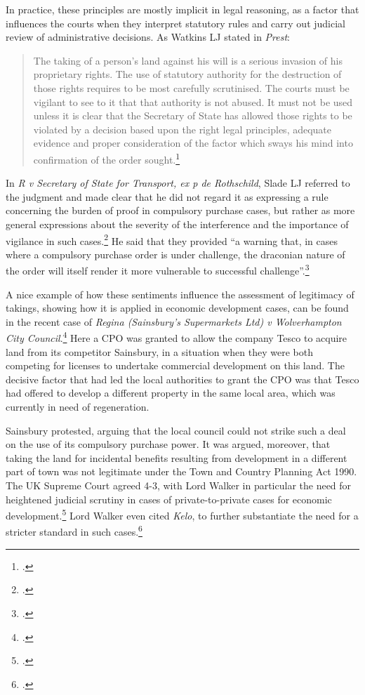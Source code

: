 In practice, these principles are mostly implicit in legal reasoning, as a factor that influences the courts when they interpret statutory rules and carry out judicial review of administrative decisions. As Watkins LJ stated in {\it Prest}:

\begin{quote}
The taking of a person's land against his will is a serious invasion of his proprietary rights. The use of statutory authority for the destruction of those rights requires to be most carefully scrutinised. The courts must be vigilant to see to it that that authority is not abused. It must not be used unless it is clear that the Secretary of State has allowed those rights to be violated by a decision based upon the right legal principles, adequate evidence and proper consideration of the factor which sways his mind into confirmation of the order sought.\footcite[211-212]{prest82}
\end{quote}

In {\it R v Secretary of State for Transport, ex p de Rothschild}, Slade LJ referred to the judgment and made clear that he did not regard it as expressing a rule concerning the burden of proof in compulsory purchase cases, but rather as more general expressions about the severity of the interference and the importance of vigilance in such cases.\footcite{rothschild89} He said that they provided ``a warning that, in cases where a compulsory purchase order is under challenge, the draconian nature of the order will itself render it more vulnerable to successful challenge''.\footcite[938]{rothschild89}

A nice example of how these sentiments influence the assessment of legitimacy of takings, showing how it is applied in economic development cases, can be found in the recent case of {\it Regina (Sainsbury’s Supermarkets Ltd) v Wolverhampton City Council}.\footcite{sainsbury10} Here a CPO was granted to allow the company Tesco to acquire land from its competitor Sainsbury, in a situation when they were both competing for licenses to undertake commercial development on this land. The decisive factor that had led the local authorities to grant the CPO was that Tesco had offered to develop a different property in the same local area, which was currently in need of regeneration. 

Sainsbury protested, arguing that the local council could not strike such a deal on the use of its compulsory purchase power. It was argued, moreover, that taking the land for incidental benefits resulting from development in a different part of town was not legitimate under the Town and Country Planning Act 1990. The UK Supreme Court agreed 4-3, with Lord Walker in particular  the need for heightened judicial scrutiny in cases of private-to-private cases for economic development.\footcite[80-84]{sainsbury10} Lord Walker even cited {\it Kelo}, to further substantiate the need for a stricter standard in such cases.\footcite[81]{sainsbury10} 

